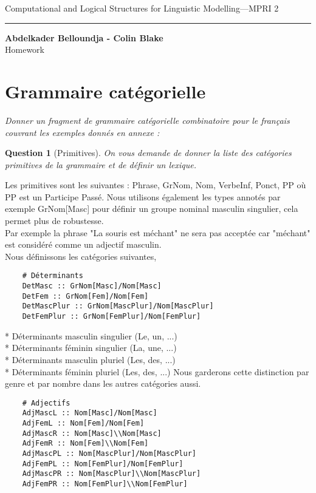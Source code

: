 \documentclass[12pt]{article}
\theoremstyle{exostyle}
\newtheorem{exo}{Question}[section]
\newcommand{\unite}
{
        \begin{center}
Computational and Logical Structures for Linguistic Modelling---MPRI 2
        \vspace{0,1cm}
        \hrule
        \end{center}
}
\begin{document}
\unite

\begin{center}
{\bf {\Large  Abdelkader Belloundja - Colin Blake}}\\
{\small Homework}
\end{center}

\section{Grammaire catégorielle}
\textit{Donner un fragment de grammaire catégorielle combinatoire pour le français couvrant
les exemples donnés en annexe :}

\begin{exo}[Primitives]
\textit{On vous demande de donner la liste des catégories primitives de la grammaire
et de définir un lexique.}
\end{exo}
Les primitives sont les suivantes : Phrase, GrNom, Nom, VerbeInf, Ponct, PP où PP est un Participe Passé. Nous utilisons également les types annotés par exemple GrNom[Masc] pour définir un groupe nominal masculin singulier, cela permet plus de robustesse.\\
Par exemple la phrase "La souris est méchant" ne sera pas acceptée car "méchant" est considéré comme un adjectif masculin.\\

Nous définissons les catégories suivantes,

\begin{verbatim}
    # Déterminants
    DetMasc :: GrNom[Masc]/Nom[Masc]                     
    DetFem :: GrNom[Fem]/Nom[Fem]                        
    DetMascPlur :: GrNom[MascPlur]/Nom[MascPlur]   
    DetFemPlur :: GrNom[FemPlur]/Nom[FemPlur]       
\end{verbatim}
* Déterminants masculin singulier (Le, un, ...)\\
* Déterminants féminin singulier (La, une, ...)\\
 * Déterminants masculin pluriel (Les, des, ...)\\
* Déterminants féminin pluriel (Les, des, ...)
Nous garderons cette distinction par genre et par nombre dans les autres catégories aussi.

\begin{verbatim}
    # Adjectifs
    AdjMascL :: Nom[Masc]/Nom[Masc]
    AdjFemL :: Nom[Fem]/Nom[Fem]
    AdjMascR :: Nom[Masc]\\Nom[Masc]
    AdjFemR :: Nom[Fem]\\Nom[Fem]
    AdjMascPL :: Nom[MascPlur]/Nom[MascPlur]
    AdjFemPL :: Nom[FemPlur]/Nom[FemPlur]
    AdjMascPR :: Nom[MascPlur]\\Nom[MascPlur]
    AdjFemPR :: Nom[FemPlur]\\Nom[FemPlur]
\end{verbatim}
\end{document}
